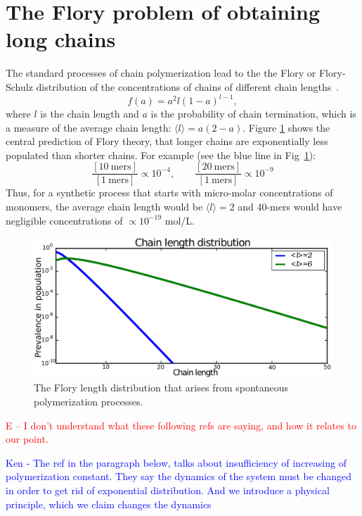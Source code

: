 \documentclass[journal=jacsat,manuscript=article,layout=twocolumn]{achemso}
\newcommand*{\pq}[1]{\left[ #1 \right]}
\newcommand*{\red}[1]{\textcolor{red}{#1}}
\newcommand*{\blue}[1]{\textcolor{blue}{#1}}
\begin{document}
\section{The Flory problem of obtaining long chains}
\label{sec:flory} 
The standard processes of chain polymerization lead to the the Flory or Flory-Schulz distribution of the concentrations of chains of different chain lengths~\cite{Flory1953}. 
\begin{equation}
 f(a)=a^2l(1-a)^{l-1},
\end{equation} 
where $l$ is the chain length and $a$ is the probability of chain termination, which is a measure of the average chain length: $\langle l \rangle = a(2- a)$.
Figure \ref{fig:flory} shows the central prediction of Flory theory, that longer chains are exponentially less populated than shorter chains.  For example (see the blue line in Fig~\ref{fig:flory}):
\begin{equation}
  \frac{\pq{10~\mathrm{mers}}}{\pq{1~\mathrm{mers}}}\propto10^{-4},\qquad\frac{\pq{20~\mathrm{mers}}}{\pq{1~\mathrm{mers}}}\propto10^{-9}
\end{equation} 
Thus, for a synthetic process that starts with micro-molar concentrations of monomers, the 
average chain length would be $\langle l \rangle = 2$ and 40-mers would have 
negligible concentrations of $\propto 10^{-19} $ mol/L. 
\begin{figure}[h!]
  \centering
  \includegraphics[width=\columnwidth]{pictures/flory2.pdf} 
  \caption{The Flory length distribution that arises from spontaneous polymerization processes.}
  \label{fig:flory}
\end{figure}

\red{E -- I don't understand what these following refs are saying, and how it relates to our 
point.}

 \blue{Ken - The ref in the paragraph below, talks about insufficiency of increasing of 
polymerization constant. They say the dynamics of the system must be changed in order to get rid of 
exponential distribution. And we introduce a physical principle, which we claim changes the 
dynamics}
\end{document}
